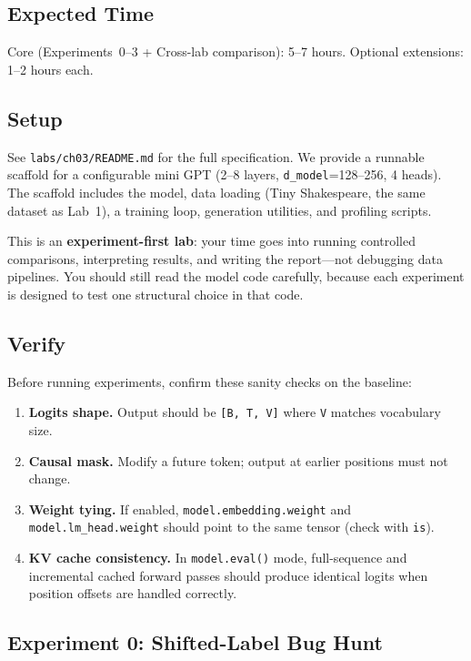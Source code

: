 \subsection*{Expected Time}

Core (Experiments~0--3 + Cross-lab comparison): 5--7 hours. Optional extensions: 1--2 hours each.

\subsection*{Setup}

See \texttt{labs/ch03/README.md} for the full specification. We provide a runnable scaffold for a configurable mini GPT (2--8 layers, \texttt{d\_model}=128--256, 4 heads). The scaffold includes the model, data loading (Tiny Shakespeare, the same dataset as Lab~1), a training loop, generation utilities, and profiling scripts.

\noindent This is an \textbf{experiment-first lab}: your time goes into running controlled comparisons, interpreting results, and writing the report---not debugging data pipelines. You should still read the model code carefully, because each experiment is designed to test one structural choice in that code.

\subsection*{Verify}

Before running experiments, confirm these sanity checks on the baseline:

\begin{enumerate}[nosep]
    \item \textbf{Logits shape.} Output should be \texttt{[B, T, V]} where \texttt{V} matches vocabulary size.
    \item \textbf{Causal mask.} Modify a future token; output at earlier positions must not change.
    \item \textbf{Weight tying.} If enabled, \texttt{model.embedding.weight} and \texttt{model.lm\_head.weight} should point to the same tensor (check with \texttt{is}).
    \item \textbf{KV cache consistency.} In \texttt{model.eval()} mode, full-sequence and incremental cached forward passes should produce identical logits when position offsets are handled correctly.
\end{enumerate}

\subsection*{Experiment 0: Shifted-Label Bug Hunt}

